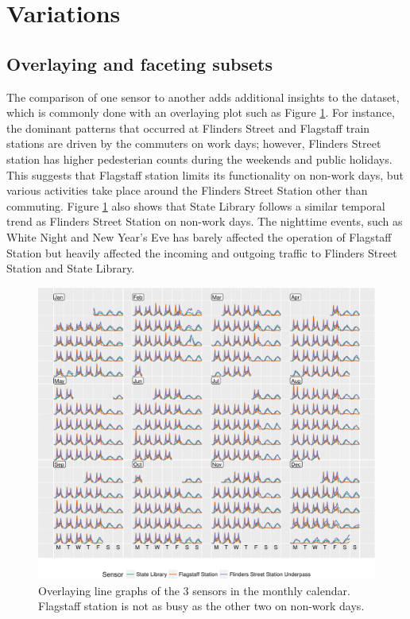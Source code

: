 \documentclass[article]{jss}
\begin{document}
\section{Variations}\label{variations}

\label{sec:examples}

\subsection{Overlaying and faceting
subsets}\label{overlaying-and-faceting-subsets}

The comparison of one sensor to another adds additional insights to the
dataset, which is commonly done with an overlaying plot such as Figure
\ref{fig:overlay}. For instance, the dominant patterns that occurred at
Flinders Street and Flagstaff train stations are driven by the commuters
on work days; however, Flinders Street station has higher pedesterian
counts during the weekends and public holidays. This suggests that
Flagstaff station limits its functionality on non-work days, but various
activities take place around the Flinders Street Station other than
commuting. Figure \ref{fig:overlay} also shows that State Library
follows a similar temporal trend as Flinders Street Station on non-work
days. The nighttime events, such as White Night and New Year's Eve has
barely affected the operation of Flagstaff Station but heavily affected
the incoming and outgoing traffic to Flinders Street Station and State
Library.

\begin{CodeChunk}
\begin{figure}

{\centering \includegraphics[width=\textwidth]{figure/overlay-1} 

}

\caption[Overlaying line graphs of the 3 sensors in the monthly calendar]{Overlaying line graphs of the 3 sensors in the monthly calendar. Flagstaff station is not as busy as the other two on non-work days.}\label{fig:overlay}
\end{figure}
\end{CodeChunk}
\end{document}
